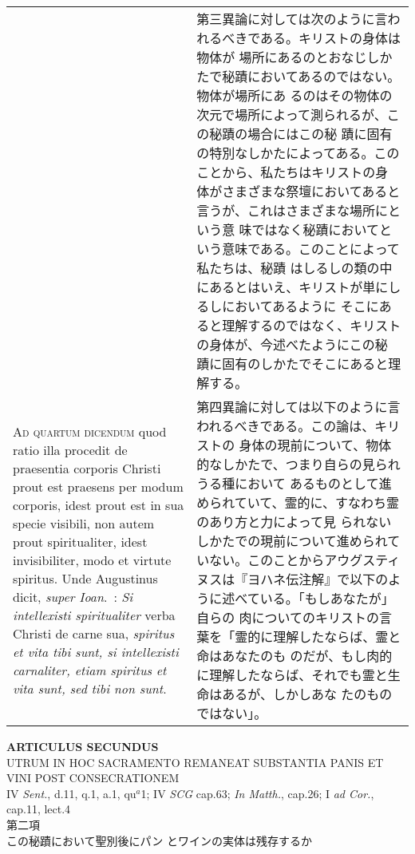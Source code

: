 \documentclass[10pt]{jsarticle} %
\begin{document}
\begin{longtable}{p{21em}p{21em}}
&

第三異論に対しては次のように言われるべきである。キリストの身体は物体が
場所にあるのとおなじしかたで秘蹟においてあるのではない。物体が場所にあ
るのはその物体の次元で場所によって測られるが、この秘蹟の場合にはこの秘
蹟に固有の特別なしかたによってある。このことから、私たちはキリストの身
体がさまざまな祭壇においてあると言うが、これはさまざまな場所にという意
味ではなく秘蹟においてという意味である。このことによって私たちは、秘蹟
はしるしの類の中にあるとはいえ、キリストが単にしるしにおいてあるように
そこにあると理解するのではなく、キリストの身体が、今述べたようにこの秘
蹟に固有のしかたでそこにあると理解する。


\\




{\scshape Ad quartum dicendum} quod ratio illa procedit de praesentia
corporis Christi prout est praesens per modum corporis, idest prout
est in sua specie visibili, non autem prout spiritualiter, idest
invisibiliter, modo et virtute spiritus. Unde Augustinus dicit,
{\itshape super Ioan}.~: {\itshape Si intellexisti spiritualiter}
verba Christi de carne sua, {\itshape spiritus et vita tibi sunt, si
intellexisti carnaliter, etiam spiritus et vita sunt, sed tibi non
sunt}.

&

第四異論に対しては以下のように言われるべきである。この論は、キリストの
身体の現前について、物体的なしかたで、つまり自らの見られうる種において
あるものとして進められていて、霊的に、すなわち霊のあり方と力によって見
られないしかたでの現前について進められていない。このことからアウグスティ
ヌスは『ヨハネ伝注解』で以下のように述べている。「もしあなたが」自らの
肉についてのキリストの言葉を「霊的に理解したならば、霊と命はあなたのも
のだが、もし肉的に理解したならば、それでも霊と生命はあるが、しかしあな
たのものではない」。


\end{longtable}
\newpage

\begin{center}
{\Large {\bf ARTICULUS SECUNDUS}}\\ {\large UTRUM IN HOC SACRAMENTO
REMANEAT SUBSTANTIA PANIS ET VINI POST CONSECRATIONEM}\\
{\footnotesize IV {\itshape Sent.}, d.11, q.1, a.1, qu$^{a}$1; IV
{\itshape SCG} cap.63; {\itshape In Matth.}, cap.26; I {\itshape ad
Cor.}, cap.11, lect.4}\\ {\Large 第二項\\この秘蹟において聖別後にパン
とワインの実体は残存するか}
\end{center}
\end{document}
